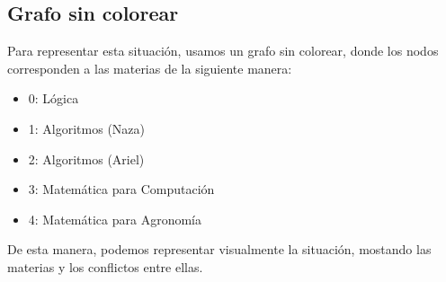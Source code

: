 \documentclass[a4paper,11pt]{article}
\begin{document}
\newpage

\subsection{Grafo sin colorear}

Para representar esta situación, usamos un grafo sin colorear, donde los nodos corresponden a las materias de la siguiente manera:

\begin{itemize}
    \item 0: Lógica
    \item 1: Algoritmos (Naza)
    \item 2: Algoritmos (Ariel)
    \item 3: Matemática para Computación
    \item 4: Matemática para Agronomía
\end{itemize}

\begin{center}
\end{center}
De esta manera, podemos representar visualmente la situación, mostando las materias y los conflictos entre ellas.
\end{document}
